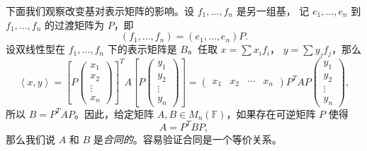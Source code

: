 \documentclass[fontset=none,zihao=-4]{Notes}
\newcommand{\inn}[1]{\left\langle#1\right\rangle}
\begin{document}
下面我们观察改变基对表示矩阵的影响。设 $f_1,\dots,f_n$ 是另一组基，
记 $e_1,\dots,e_n$ 到 $f_1,\dots,f_n$ 的过渡矩阵为 $P$，即
\[
  (f_1,\dots,f_n)=(e_1,\dots,e_n)P.  
\]
设双线性型在 $f_1,\dots,f_n$ 下的表示矩阵是 $B$。任取 $x=\sum x_if_i$，
$y=\sum y_jf_j$，那么
\[
  \inn{x,y}= \left[P\begin{pmatrix}
    x_1 \\x_2 \\ \vdots \\ x_n
  \end{pmatrix}\right]^T A\left[
    P  \begin{pmatrix}
      y_1 \\ y_2 \\ \vdots \\ y_n
    \end{pmatrix}
  \right]=  \begin{pmatrix}
    x_1 & x_2 & \cdots & x_n
  \end{pmatrix}P^TAP
  \begin{pmatrix}
    y_1 \\ y_2 \\ \vdots \\ y_n
  \end{pmatrix},
\]
所以 $B=P^TAP$。因此，给定矩阵 $A,B\in M_n(\mathbb{F})$，如果存在可逆矩阵
$P$ 使得
\[
  A=P^TBP,  
\]
那么我们说 $A$ 和 $B$ 是\emph{合同的}。容易验证合同是一个等价关系。
\end{document}
